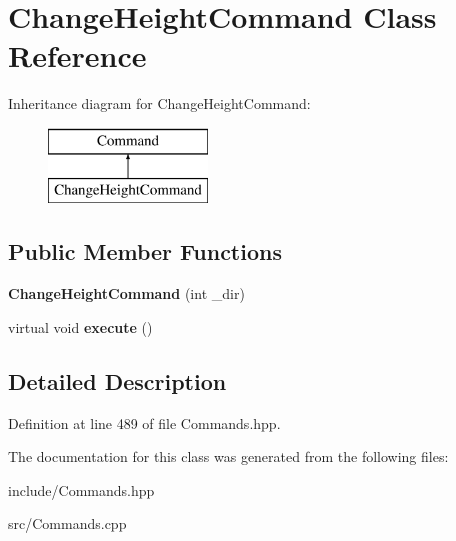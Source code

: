 \hypertarget{class_change_height_command}{}\section{Change\+Height\+Command Class Reference}
\label{class_change_height_command}
Inheritance diagram for Change\+Height\+Command\+:\begin{figure}[H]
\begin{center}
\leavevmode
\includegraphics[height=2.000000cm]{class_change_height_command}
\end{center}
\end{figure}
\subsection*{Public Member Functions}
\begin{DoxyCompactItemize}
\item 
\hypertarget{class_change_height_command_a794c7d80c4a9309059c37f6d4acaccfa}{}{\bfseries Change\+Height\+Command} (int \+\_\+dir)\label{class_change_height_command_a794c7d80c4a9309059c37f6d4acaccfa}

\item 
\hypertarget{class_change_height_command_a8f87df837c29cf1930226059f63e90a4}{}virtual void {\bfseries execute} ()\label{class_change_height_command_a8f87df837c29cf1930226059f63e90a4}

\end{DoxyCompactItemize}


\subsection{Detailed Description}


Definition at line 489 of file Commands.\+hpp.



The documentation for this class was generated from the following files\+:\begin{DoxyCompactItemize}
\item 
include/Commands.\+hpp\item 
src/Commands.\+cpp\end{DoxyCompactItemize}
